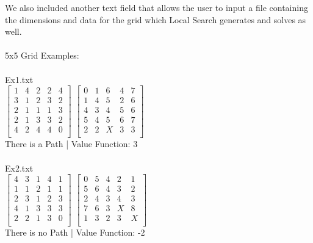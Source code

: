 \documentclass[11pt, oneside]{article}   	%
\begin{document}
We also included another text field that allows the user to input a file containing the dimensions and data for the grid which Local Search generates and solves as well.\\
\\
5x5 Grid Examples:\\
\\
Ex1.txt\\
$
\left[
	\begin{array}{ccccc}
		1&4&2&2&4\\
		3&1&2&3&2\\
		2&1&1&1&3\\
		2&1&3&3&2\\
		4&2&4&4&0\\
	\end{array}
\right]
$
$
\left[
	\begin{array}{ccccc}
		0&1&6&4&7\\
		1&4&5&2&6\\
		4&3&4&5&6\\
		5&4&5&6&7\\
		2&2&X&3&3\\
	\end{array}
\right]
$\\
There is a Path  |  Value Function: 3\\
\\
Ex2.txt\\
$
\left[
	\begin{array}{ccccc}
		4&3&1&4&1\\
		1&1&2&1&1\\
		2&3&1&2&3\\
		4&1&3&3&3\\
		2&2&1&3&0\\
	\end{array}
\right]
$
$
\left[
	\begin{array}{ccccc}
		0&5&4&2&1\\
		5&6&4&3&2\\
		2&4&3&4&3\\
		7&6&3&X&8\\
		1&3&2&3&X\\
	\end{array}
\right]
$\\
There is no Path  |  Value Function: -2\\
\\
\end{document}
